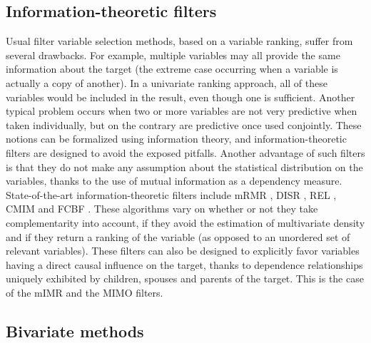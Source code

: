\subsection{Information-theoretic filters}

Usual filter variable selection methods, based on a variable ranking, suffer
from several drawbacks. For example, multiple variables may all provide the same
information about the target (the extreme case occurring when a variable is
actually a copy of another). In a univariate ranking approach, all of these
variables would be included in the result, even though one is sufficient.
Another typical problem occurs when two or more variables are not very
predictive when taken individually, but on the contrary are predictive once used
conjointly. These notions can be formalized using information theory, and
information-theoretic filters are designed to avoid the exposed pitfalls.
Another advantage of such filters is that they do not make any assumption about
the statistical distribution on the variables, thanks to the use of mutual
information as a dependency measure. State-of-the-art information-theoretic
filters include mRMR \parencite{peng2005feature}, DISR
\parencite{meyer2008information}, REL \parencite{bell2000formalism}, CMIM
\parencite{fleuret2004fast} and FCBF \parencite{yu2004efficient}. These
algorithms vary on whether or not they take complementarity into account, if
they avoid the estimation of multivariate density and if they return a ranking
of the variable (as opposed to an unordered set of relevant variables). These
filters can also be designed to explicitly favor variables having a direct
causal influence on the target, thanks to dependence relationships uniquely
exhibited by children, spouses and parents of the target. This is the case of
the mIMR \parencite{bontempi2010causal} and the MIMO
\parencite{bontempi2011multiple} filters.

\subsection{Bivariate methods}

